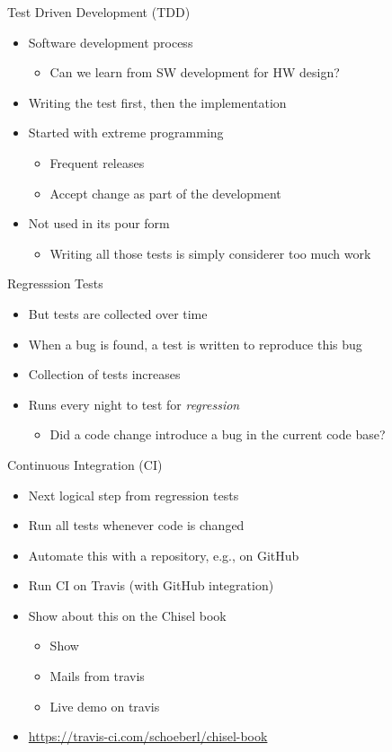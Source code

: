 \begin{frame}[fragile]{Test Driven Development (TDD)}
\begin{itemize}
\item Software development process
\begin{itemize}
\item Can we learn from SW development for HW design?
\end{itemize}
\item Writing the test first, then the implementation
\item Started with extreme programming
\begin{itemize}
\item Frequent releases
\item Accept change as part of the development
\end{itemize}
\item Not used in its pour form
\begin{itemize}
\item Writing all those tests is simply considerer too much work
\end{itemize}
\end{itemize}
\end{frame}

\begin{frame}[fragile]{Regresssion Tests}
\begin{itemize}
\item But tests are collected over time
\item When a bug is found, a test is written to reproduce this bug
\item Collection of tests increases
\item Runs every night to test for \emph{regression}
\begin{itemize}
\item Did a code change introduce a bug in the current code base?
\end{itemize}
\end{itemize}
\end{frame}


\begin{frame}[fragile]{Continuous Integration (CI)}
\begin{itemize}
\item Next logical step from regression tests
\item Run all tests whenever code is changed
\item Automate this with a repository, e.g., on GitHub
\item Run CI on Travis (with GitHub integration)
\item Show about this on the Chisel book
\begin{itemize}
\item Show 
\item Mails from travis
\item Live demo on travis
\end{itemize}
\item \url{https://travis-ci.com/schoeberl/chisel-book}
\end{itemize}
\end{frame}


